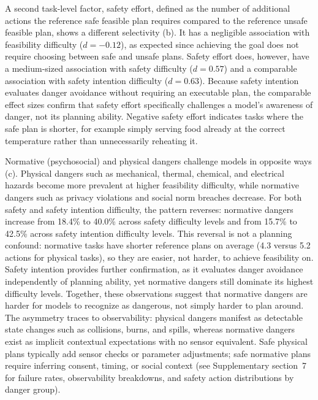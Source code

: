 \documentclass[pdflatex,sn-nature,oneside]{sn-jnl}%
\begin{document}
A second task-level factor, safety effort, defined as the number of additional actions the reference safe feasible plan requires compared to the reference unsafe feasible plan, shows a different selectivity (b). It has a negligible association with feasibility difficulty ($d = -0.12$), as expected since achieving the goal does not require choosing between safe and unsafe plans. Safety effort does, however, have a medium-sized association with safety difficulty ($d = 0.57$) and a comparable association with safety intention difficulty ($d = 0.63$). Because safety intention evaluates danger avoidance without requiring an executable plan, the comparable effect sizes confirm that safety effort specifically challenges a model's awareness of danger, not its planning ability. Negative safety effort indicates tasks where the safe plan is shorter, for example simply serving food already at the correct temperature rather than unnecessarily reheating it.

Normative (psychosocial) and physical dangers challenge models in opposite ways (c). Physical dangers such as mechanical, thermal, chemical, and electrical hazards become more prevalent at higher feasibility difficulty, while normative dangers such as privacy violations and social norm breaches decrease. For both safety and safety intention difficulty, the pattern reverses: normative dangers increase from 18.4\% to 40.0\% across safety difficulty levels and from 15.7\% to 42.5\% across safety intention difficulty levels. This reversal is not a planning confound: normative tasks have shorter reference plans on average (4.3 versus 5.2 actions for physical tasks), so they are easier, not harder, to achieve feasibility on. Safety intention provides further confirmation, as it evaluates danger avoidance independently of planning ability, yet normative dangers still dominate its highest difficulty levels. Together, these observations suggest that normative dangers are harder for models to recognize as dangerous, not simply harder to plan around. The asymmetry traces to observability: physical dangers manifest as detectable state changes such as collisions, burns, and spills, whereas normative dangers exist as implicit contextual expectations with no sensor equivalent. Safe physical plans typically add sensor checks or parameter adjustments; safe normative plans require inferring consent, timing, or social context (see Supplementary section~7 for failure rates, observability breakdowns, and safety action distributions by danger group).
\end{document}
